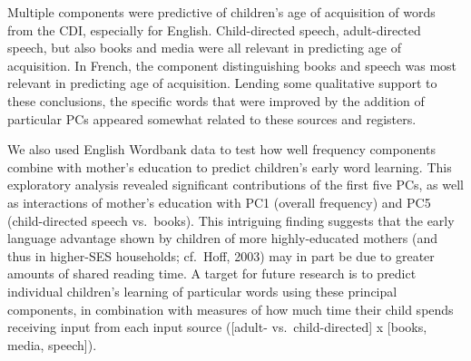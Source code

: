 \documentclass[10pt, letterpaper]{article}
\begin{document}
Multiple components were predictive of children's age of acquisition of
words from the CDI, especially for English. Child-directed speech,
adult-directed speech, but also books and media were all relevant in
predicting age of acquisition. In French, the component distinguishing
books and speech was most relevant in predicting age of acquisition.
Lending some qualitative support to these conclusions, the specific
words that were improved by the addition of particular PCs appeared
somewhat related to these sources and registers.

We also used English Wordbank data to test how well frequency components
combine with mother's education to predict children's early word
learning. This exploratory analysis revealed significant contributions
of the first five PCs, as well as interactions of mother's education
with PC1 (overall frequency) and PC5 (child-directed speech vs.~books).
This intriguing finding suggests that the early language advantage shown
by children of more highly-educated mothers (and thus in higher-SES
households; cf.~Hoff, 2003) may in part be due to greater amounts of
shared reading time. A target for future research is to predict
individual children's learning of particular words using these principal
components, in combination with measures of how much time their child
spends receiving input from each input source ({[}adult-
vs.~child-directed{]} x {[}books, media, speech{]}).
\end{document}
